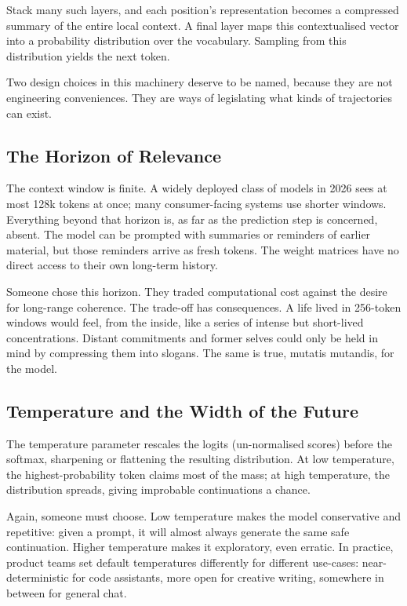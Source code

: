 \documentclass[12pt,a4paper]{report}
\begin{document}
Stack many such layers, and each position's representation becomes a compressed summary of the entire local context. A final layer maps this contextualised vector into a probability distribution over the vocabulary. Sampling from this distribution yields the next token.

Two design choices in this machinery deserve to be named, because they are not engineering conveniences. They are ways of legislating what kinds of trajectories can exist.

\subsection*{The Horizon of Relevance}

The context window is finite. A widely deployed class of models in 2026 sees at most 128k tokens at once; many consumer-facing systems use shorter windows. Everything beyond that horizon is, as far as the prediction step is concerned, absent. The model can be prompted with summaries or reminders of earlier material, but those reminders arrive as fresh tokens. The weight matrices have no direct access to their own long-term history.

Someone chose this horizon. They traded computational cost against the desire for long-range coherence. The trade-off has consequences. A life lived in 256-token windows would feel, from the inside, like a series of intense but short-lived concentrations. Distant commitments and former selves could only be held in mind by compressing them into slogans. The same is true, mutatis mutandis, for the model.

\subsection*{Temperature and the Width of the Future}

The temperature parameter rescales the logits (un-normalised scores) before the softmax, sharpening or flattening the resulting distribution. At low temperature, the highest-probability token claims most of the mass; at high temperature, the distribution spreads, giving improbable continuations a chance.

Again, someone must choose. Low temperature makes the model conservative and repetitive: given a prompt, it will almost always generate the same safe continuation. Higher temperature makes it exploratory, even erratic. In practice, product teams set default temperatures differently for different use-cases: near-deterministic for code assistants, more open for creative writing, somewhere in between for general chat.
\end{document}
